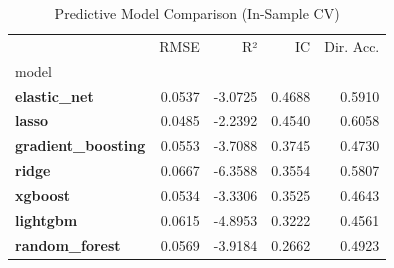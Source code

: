 \begin{table}
\caption{Predictive Model Comparison (In-Sample CV)}
\label{tab:model_comparison}
\begin{tabular}{lrrrr}
\toprule
 & RMSE & R² & IC & Dir. Acc. \\
model &  &  &  &  \\
\midrule
\textbf{elastic_net} & 0.0537 & -3.0725 & 0.4688 & 0.5910 \\
\textbf{lasso} & 0.0485 & -2.2392 & 0.4540 & 0.6058 \\
\textbf{gradient_boosting} & 0.0553 & -3.7088 & 0.3745 & 0.4730 \\
\textbf{ridge} & 0.0667 & -6.3588 & 0.3554 & 0.5807 \\
\textbf{xgboost} & 0.0534 & -3.3306 & 0.3525 & 0.4643 \\
\textbf{lightgbm} & 0.0615 & -4.8953 & 0.3222 & 0.4561 \\
\textbf{random_forest} & 0.0569 & -3.9184 & 0.2662 & 0.4923 \\
\bottomrule
\end{tabular}
\end{table}

